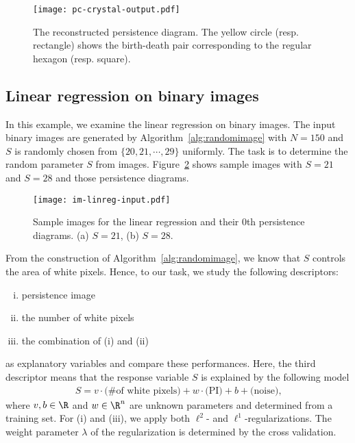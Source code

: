 \documentclass[smallextended]{svjour3}
\begin{document}
\begin{figure}[htbp]
  \centering
  \texttt{[image: pc-crystal-output.pdf]}
  \caption{The reconstructed persistence diagram. The yellow circle (resp. rectangle)
  shows the birth-death pair corresponding to the regular hexagon (resp. square).}
  \label{fig:pc-crystal-output}
\end{figure}






\subsection{Linear regression on binary images}
In this example, we examine the linear regression on binary images.
The input binary images are generated by Algorithm~\ref{alg:randomimage}
with $N=150$ and $S$ is randomly chosen from $\{20, 21, \cdots, 29\}$ uniformly.
The task is to determine the random parameter $S$ from images.
Figure~\ref{fig:im_linreg_input} shows sample images with $S=21$ and $S=28$ and those persistence diagrams. 

\begin{figure}[htbp]
  \centering
  \texttt{[image: im-linreg-input.pdf]}
  \caption{Sample images for the linear regression and
    their 0th persistence diagrams. (a) $S=21$, (b) $S=28$.}
  \label{fig:im_linreg_input}
\end{figure}

From the construction of Algorithm~\ref{alg:randomimage}, we know that $S$ controls the area of white pixels. Hence, to our task, we study the following descriptors:
\begin{enumerate}[(i)]
\item persistence image
\item the number of white pixels
\item the combination of (i) and (ii)
\end{enumerate}
as explanatory variables and compare these performances.
Here, the third descriptor means that the response variable $S$ is explained by the following model
\begin{align}
  S = v\cdot\textrm{(\# of white pixels)} + w \cdot \textrm{(PI)} + b +
      \textrm{(noise),} \label{eq:im_linearmodel} 
\end{align}
where $v, b \in \R$ and $w \in \R^n$ are unknown parameters and determined from a training set. For (i) and (iii), we apply both $\ell^2$- and $\ell^1$-regularizations. The weight parameter $\lambda$ of the regularization is determined by the cross validation.
\end{document}
